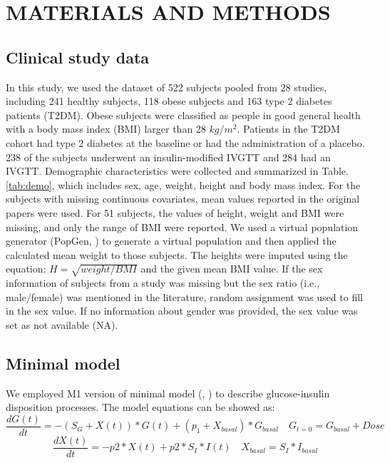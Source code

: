 \documentclass[utf8]{frontiersSCNS} %
\begin{document}
\section{MATERIALS AND METHODS}

\subsection{Clinical study data}
In this study, we used the dataset of 522 subjects pooled from 28 studies, including 241 healthy subjects, 118 obese subjects and 163 type 2 diabetes patients (T2DM). Obese subjects were classified as people in good general health with a body mass index (BMI) larger than 28 $kg/m^2$. Patients in the T2DM cohort had type 2 diabetes at the baseline or had the administration of a placebo. 238 of the subjects underwent an insulin-modified IVGTT and 284 had an IVGTT. Demographic characteristics were collected and summarized in Table. \ref{tab:demo}, which includes sex, age, weight, height and body mass index. For the subjects with missing continuous covariates, mean values reported in the original papers were used. For 51 subjects, the values of height, weight and BMI were missing, and only the range of BMI were reported. We used a virtual population generator (PopGen, \cite{McNally2015}) to generate a virtual population and then applied the calculated mean weight to those subjects. The heights were imputed using the equation: $H=\sqrt{weight/BMI}$ and the given mean BMI value. If the sex information of subjects from a study was missing but the sex ratio (i.e., male/female) was mentioned in the literature, random assignment was used to fill in the sex value. If no information about gender was provided, the sex value was set as not available (NA).

\subsection{Minimal model}
We employed M1 version of minimal model (\cite{Bergman1979}, \cite{Araujo-vilar1998}) to describe glucose-insulin disposition processes. The model equations can be showed as:
\begin{equation}
\frac{dG(t)}{dt} =-(S_G+X(t))*G(t)+(p_1+X_{basal})*G_{basal} \quad G_{t=0} =G_{basal}+Dose\label{eq:01}
\end{equation}
\begin{equation}
\frac{dX(t)}{dt} =-p2*X(t)+p2*S_I*I(t) \quad X_{basal} =S_I*I_{basal}\label{eq:02}
\end{equation}
\end{document}
